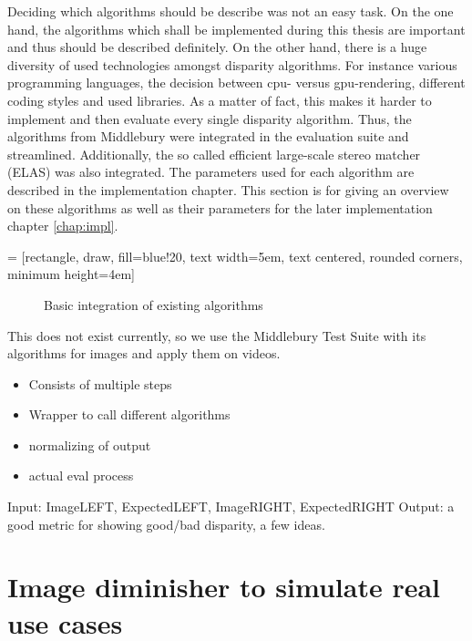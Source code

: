 Deciding which algorithms should be describe was not an easy task.
On the one hand, the algorithms which shall be implemented during this thesis are important and thus should be described definitely.
On the other hand, there is a huge diversity of used technologies amongst disparity algorithms.
For instance various programming languages, the decision between cpu- versus gpu-rendering, different coding styles and used libraries.
As a matter of fact, this makes it harder to implement and then evaluate every single disparity algorithm.
Thus, the algorithms from Middlebury were integrated in the evaluation suite and streamlined.
Additionally, the so called efficient large-scale stereo matcher (ELAS) was also integrated.
The parameters used for each algorithm are described in the implementation chapter.
This section is for giving an overview on these algorithms as well as their parameters for the later implementation chapter \ref{chap:impl}.

 = [rectangle, draw, fill=blue!20,
    text width=5em, text centered, rounded corners, minimum height=4em]

\begin{figure}[h]
  \centering
  \caption{Basic integration of existing algorithms}
  \label{fig:integration}
\end{figure}

This does not exist currently, so we use the Middlebury Test Suite with its algorithms for images and apply them on videos.

\begin{itemize}
	\item Consists of multiple steps
	\item Wrapper to call different algorithms
	\item normalizing of output
	\item actual eval process
\end{itemize}

Input: ImageLEFT, ExpectedLEFT, ImageRIGHT, ExpectedRIGHT
Output: a good metric for showing good/bad disparity, a few ideas.

\section{Image diminisher to simulate real use cases}

